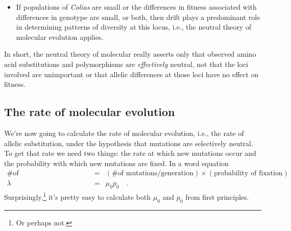 \begin{itemize}
\begin{itemize}
\item If populations of {\it Colias\/} are small or the differences in
  fitness associated with differences in genotype are small, or both,
  then drift plays a predominant role in determining patterns of
  diversity at this locus, i.e., the neutral theory of molecular
  evolution applies.

\end{itemize}

\end{itemize}

\noindent In short, the neutral theory of molecular really asserts
only that observed amino acid substitutions and polymorphisms are {\it
effectively\/} neutral, not that the loci involved are unimportant or
that allelic differences at those loci have no effect on
fitness.

\subsection*{The rate of molecular evolution}

We're now going to calculate the rate of molecular evolution, i.e.,
the rate of allelic substitution, under the hypothesis that mutations
are selectively neutral. To get that rate we need two things: the rate
at which new mutations occur and the probability with which new
mutations are fixed. In a word equation
\begin{eqnarray*}
\mbox{\# of substitutions/generation} &=& (\mbox{\# of mutations/generation})\times(\mbox{probability
  of fixation}) \\
\lambda &=& \mu_0p_0 \quad .
\end{eqnarray*}
Surprisingly,\footnote{Or perhaps not.} it's pretty easy to calculate
both $\mu_0$ and $p_0$ from first principles.

